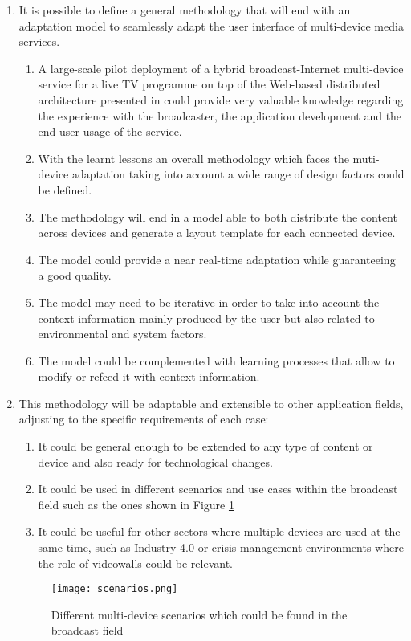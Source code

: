 \begin{enumerate}
			
	\item It is possible to define a general methodology that will end with an adaptation model to seamlessly adapt the user interface of multi-device media services.

		\begin{enumerate}
			\item A large-scale pilot deployment of a hybrid broadcast-Internet multi-device service for a live TV programme on top of the Web-based distributed architecture presented in \cite{Zorrilla2015} could provide very valuable knowledge regarding the experience with the broadcaster, the application development and the end user usage of the service.
			\item With the learnt lessons an overall methodology which faces the muti-device adaptation taking into account a wide range of design factors could be defined.
			\item The methodology will end in a model able to both distribute the content across devices and generate a layout template for each connected device.
			\item The model could provide a near real-time adaptation while guaranteeing a good quality.
			\item The model may need to be iterative in order to take into account the context information mainly produced by the user but also related to environmental and system factors. 
			\item The model could be complemented with learning processes that allow to modify or refeed it with context information.		
		\end{enumerate}
	\item This methodology will be adaptable and extensible to other application fields, adjusting to the specific requirements of each case:
	
	\begin{enumerate}
		\item It could be general enough to be extended to any type of content or device and also ready for technological changes.
		\item It could be used in different scenarios and use cases within the broadcast field such as the ones shown in Figure \ref{fig:scenarios}
		\item It could be useful for other sectors where multiple devices are used at the same time, such as Industry 4.0 or crisis management environments where the role of videowalls could be relevant.
	\end{enumerate}
	
	\begin{figure}
		\centering
		\texttt{[image: scenarios.png]}
		\caption[Different multi-device scenarios which could be found in the broadcast field]{Different multi-device scenarios which could be found in the broadcast field}
		\label{fig:scenarios}
	\end{figure}
	
\end{enumerate}

